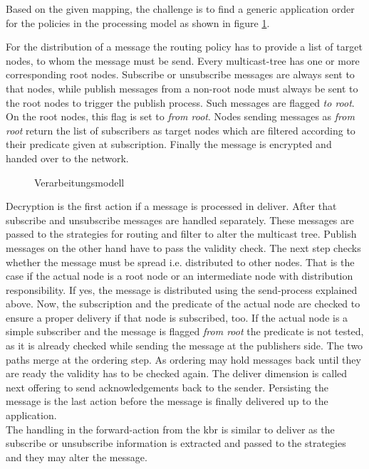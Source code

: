 Based on the given mapping, the challenge is to find a generic application order for the policies in the processing model as shown in figure \ref{fig:processing_model}.

For the distribution of a message the routing policy has to provide a list of target nodes, to whom the message must be send. Every multicast-tree has one or more corresponding root nodes. Subscribe or unsubscribe messages are always sent to that nodes, while publish messages from a non-root node must always be sent to the root nodes to trigger the publish process. Such messages are flagged \emph{to root}. On the root nodes, this flag is set to \emph{from root}. Nodes sending messages as \emph{from root} return the list of subscribers as target nodes which are filtered according to their predicate given at subscription. Finally the message is encrypted and handed over to the network.



\begin{figure}[htbp]
\centering
{}
\caption{Verarbeitungsmodell}
\label{fig:processing_model}
\end{figure}

Decryption is the first action if a message is processed in deliver. After that subscribe and unsubscribe messages are handled separately. These messages are passed to the strategies for routing and filter to alter the multicast tree. Publish messages on the other hand have to pass the validity check. The next step checks whether the message must be spread i.e. distributed to other nodes. That is the case if the actual node is a root node or an intermediate node with distribution responsibility. If yes, the message is distributed using the send-process explained above. Now, the subscription and the predicate of the actual node are checked to ensure a proper delivery if that node is subscribed, too. If the actual node is a simple subscriber and the message is flagged \emph{from root} the predicate is not tested, as it is already checked while sending the message at the publishers side. The two paths merge at the ordering step. As ordering may hold messages back until they are ready the validity has to be checked again. The deliver dimension is called next offering to send acknowledgements back to the sender. Persisting the message is the last action before the message is finally delivered up to the application.\\
The handling in the forward-action from the \ac{kbr} is similar to deliver as the subscribe or unsubscribe information is extracted and passed to the strategies and they may alter the message.

